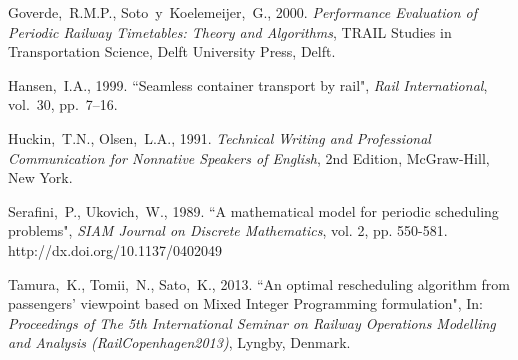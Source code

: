 \documentclass[10pt,a4paper,oneside,onecolumn]{article}
\begin{document}
\begin{thebibliography}{99}
	Goverde,~R.M.P., Soto~y~Koelemeijer,~G., 2000.
	{\em Performance Evaluation of Periodic Railway Timetables:
		Theory and Algorithms},
	TRAIL Studies in Transportation Science,
	Delft University Press, Delft.

	Hansen,~I.A., 1999.
	``Seamless container transport by rail",
	{\em Rail International},
	vol.~30, pp.~7--16.

	Huckin,~T.N., Olsen,~L.A., 1991.
	{\em Technical Writing and Professional Communication
		for Nonnative Speakers of English},
	2nd Edition, McGraw-Hill, New York.

	Serafini,~P., Ukovich,~W., 1989.
	``A mathematical model for periodic scheduling problems",
	{\em SIAM Journal on Discrete Mathematics},
	vol. 2, pp. 550-581.
	http://dx.doi.org/10.1137/0402049

	Tamura,~K., Tomii,~N., Sato,~K., 2013.
	``An optimal rescheduling algorithm from passengers' viewpoint
	based on Mixed Integer Programming formulation",
	In: {\em Proceedings of The 5th International Seminar
		on Railway Operations Modelling and Analysis (RailCopenhagen2013)},
	Lyngby, Denmark.
\end{thebibliography}

\end{document}
